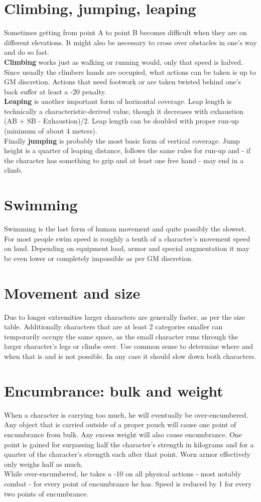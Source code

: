 \documentclass[12pt,a4paper,openany]{book}
\begin{document}
	\section{Climbing, jumping, leaping}
	Sometimes getting from point A to point B becomes difficult when they are on different elevations. It might also be necessary to cross over obstacles in one’s way and do so fast.\\
	\textbf{Climbing} works just as walking or running would, only that speed is halved. Since usually the climbers hands are occupied, what actions can be taken is up to GM discretion. Actions that need footwork or are taken twisted behind one’s back suffer at least a -20 penalty.\\
	\textbf{Leaping} is another important form of horizontal coverage. Leap length is technically a characteristic-derived value, though it decreases with exhaustion (AB + SB - Exhaustion)/2. Leap length can be doubled with proper run-up (minimum of about 4 meters).\\
	Finally \textbf{jumping} is probably the most basic form of vertical coverage. Jump height is a quarter of leaping distance, follows the same rules for run-up and - if the character has something to grip and at least one free hand - may end in a climb.
	\section{Swimming}
	Swimming is the last form of human movement and quite possibly the slowest. For most people swim speed is roughly a tenth of a character’s movement speed on land. Depending on equipment load, armor and special augmentation it may be even lower or completely impossible as per GM discretion.
	\section{Movement and size}
	Due to longer extremities larger characters are generally faster, as per the size table. Additionally characters that are at least 2 categories smaller can temporarily occupy the same space, as the small character runs through the larger character’s legs or climbs over. Use common sense to determine where and when that is and is not possible. In any case it should slow down both characters.
	\section{Encumbrance: bulk and weight}
	When a character is carrying too much, he will eventually be over-encumbered. Any object that is carried outside of a proper pouch will cause one point of encumbrance from bulk.
	Any excess weight will also cause encumbrance. One point is gained for surpassing half the character’s strength in kilograms and for a quarter of the character’s strength each after that point. Worn armor effectively only weighs half as much.\\
	While over-encumbered, he takes a -10 on all physical actions - most notably combat - for every point of encumbrance he has. Speed is reduced by 1 for every two points of encumbrance.
\end{document}
